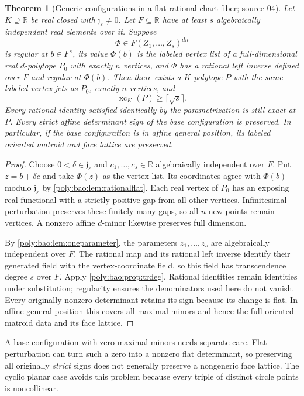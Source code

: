 \documentclass[11pt,a4paper]{article}
\numberwithin{equation}{section}
\newtheorem{theorem}{Theorem}[section]
\theoremstyle{plain}
\newcommand{\R}{\mathbb R}
\newcommand{\eps}{\varepsilon}
\newcommand{\xc}{\operatorname{xc}}
\newcommand{\JJ}{\mathfrak j}
\begin{document}
\begin{theorem}[Generic configurations in a flat rational-chart fiber; source 04]
\label{poly:bao:thm:chart}
Let $K\supseteq\R$ be real closed with $\JJ_\eps\neq0$. Let $F\subseteq\R$
have at least $s$ algebraically independent real elements over it. Suppose
\[
 \Phi\in F(Z_1,\ldots,Z_s)^{dn}
\]
is regular at $b\in F^s$, its value $\Phi(b)$ is the labeled vertex list
of a full-dimensional real $d$-polytope $P_0$ with exactly $n$ vertices,
and $\Phi$ has a rational left inverse defined over $F$ and regular at
$\Phi(b)$.
Then there exists a $K$-polytope $P$ with the same labeled vertex jets as
$P_0$, exactly $n$ vertices, and
\[
 \xc_K(P)\geq\lceil\sqrt s\rceil.
\]
Every rational identity satisfied identically by the parametrization is
still exact at $P$. Every strict affine determinant sign of the base
configuration is preserved. In particular, if the base configuration
is in affine general position, its labeled oriented matroid and face
lattice are preserved.
\end{theorem}
\begin{proof}
Choose $0<\delta\in\JJ_\eps$ and $c_1,\ldots,c_s\in\R$ algebraically
independent over $F$. Put $z=b+\delta c$ and take $\Phi(z)$ as the vertex
list. Its coordinates agree with $\Phi(b)$ modulo $\JJ_\eps$ by
\cref{poly:bao:lem:rationalflat}. Each real vertex of $P_0$ has an exposing real
functional with a strictly positive gap from all other vertices.
Infinitesimal perturbation preserves these finitely many gaps, so all
$n$ new points remain vertices. A nonzero affine $d$-minor likewise
preserves full dimension.

By \cref{poly:bao:lem:oneparameter}, the parameters $z_1,\ldots,z_s$ are
algebraically independent over $F$. The rational map and its rational
left inverse identify their generated field with the vertex-coordinate
field, so this field has transcendence degree $s$ over $F$.
Apply \cref{poly:bao:prop:trdeg}. Rational identities remain identities under
substitution; regularity ensures the denominators used here do not
vanish. Every originally nonzero determinant retains its sign because
its change is flat. In affine general position this covers all maximal
minors and hence the full oriented-matroid data and its face lattice.
\end{proof}

A base configuration with zero maximal minors needs separate care.
Flat perturbation can turn such a zero into a nonzero flat determinant,
so preserving all originally \emph{strict} signs does not generally
preserve a nongeneric face lattice. The cyclic planar case avoids this
problem because every triple of distinct circle points is noncollinear.
\end{document}
